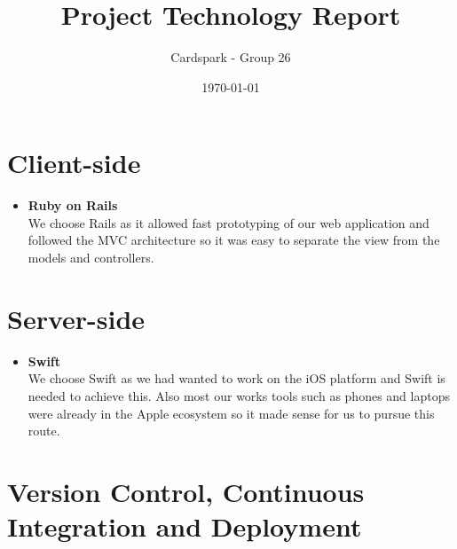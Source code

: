 \documentclass[a4wide, 11pt]{article}
\begin{document}
\title{Project Technology Report}

\author{Cardspark - Group 26}

\date{\today}         %

\maketitle            %

\section{Client-side}
\vspace{-0.5cm}

\begin{itemize}
\item \textbf{Ruby on Rails}\\
We choose Rails as it allowed fast prototyping of our web application and followed the MVC architecture so it was easy to separate the view from the models and controllers.
\end{itemize}

\vspace{-0.5cm}
\section{Server-side}
\vspace{-0.5cm}

\begin{itemize}
\item \textbf{Swift}\\
We choose Swift as we had wanted to work on the iOS platform and Swift is needed to achieve this.  Also most our works tools such as phones and laptops were already in the Apple ecosystem so it made sense for us to pursue this route.
\end{itemize}

\vspace{-0.5cm}
\section{Version Control, Continuous Integration and Deployment}
\vspace{-0.5cm}
\end{document}
